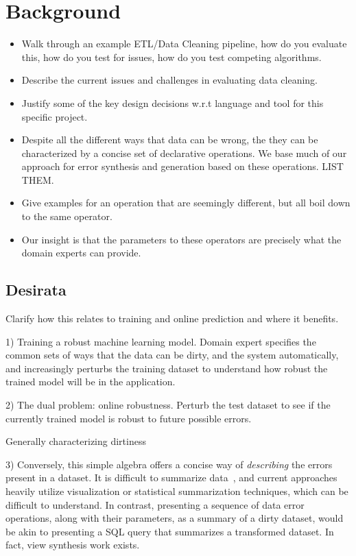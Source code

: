 \section{Background}

\begin{itemize}
    \item Walk through an example ETL/Data Cleaning pipeline, how do you evaluate this, how do you test for issues, how do you test competing algorithms.
    \item Describe the current issues and challenges in evaluating data cleaning.
    \item Justify some of the key design decisions w.r.t language and tool for this specific project.
\end{itemize}

\begin{itemize}
  \item Despite all the different ways that data can be wrong, the they can be characterized by a concise set of declarative operations.  We base much of our approach for error synthesis and generation based on these operations.  LIST THEM.
  \item Give examples for an operation that are seemingly different, but all boil down to the same operator.
  \item Our insight is that the parameters to these operators are precisely what the domain experts can provide.
\end{itemize}

\subsection{Desirata}

Clarify how this relates to training and online prediction and where it benefits.  

1) Training a robust machine learning model.  Domain expert specifies the common sets of ways that the data can be dirty, and the system automatically, and increasingly perturbs the training dataset to understand how robust the trained model will be in the application.

2) The dual problem: online robustness.  Perturb the test dataset to see if the currently trained model is robust to future possible errors.

Generally characterizing dirtiness

3) Conversely, this simple algebra offers a concise way of {\it describing} the errors present in a dataset.  It is difficult to summarize data~\cite{bhardwaj2015collaborative}, and current approaches heavily utilize visualization or statistical summarization techniques, which can be difficult to understand.  In contrast, presenting a sequence of data error operations, along with their parameters, as a summary of a dirty dataset, would be akin to presenting a SQL query that summarizes a transformed dataset.  In fact, view synthesis work exists.



